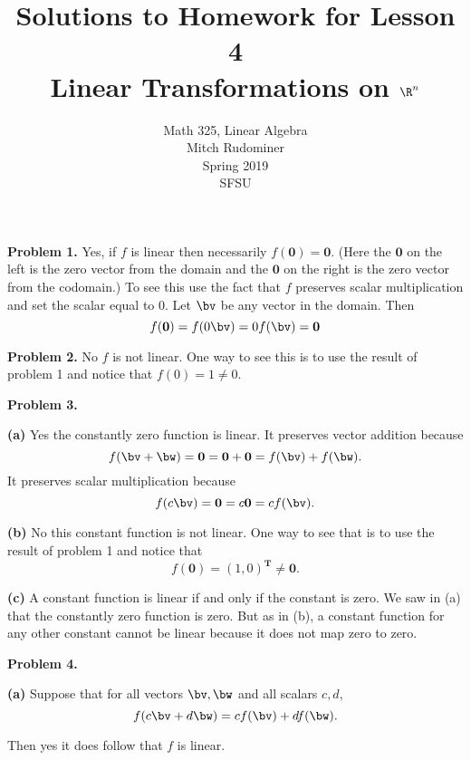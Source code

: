 \documentclass[oneside,12pt]{amsart}
\begin{document}
\title{Solutions to Homework for Lesson 4 \\ Linear Transformations on $\R^n$}
\author{Math 325, Linear Algebra \\ Mitch Rudominer \\ Spring 2019 \\ SFSU }
\date{}

\maketitle


\textbf{Problem 1.} Yes, if $f$ is linear then necessarily
$f(\mathbf{0}) = \mathbf{0}$. (Here the $\mathbf{0}$ on the left is the
zero vector from the domain and the $\mathbf{0}$ on the right is the zero vector
from the codomain.) To see this use the fact that $f$ preserves scalar multiplication
and set the scalar equal to 0. Let $\bv$ be any vector in the domain. Then
$$f(\mathbf{0}) = f(0 \bv) = 0 f(\bv) = \mathbf{0}$$

\smallskip

\textbf{Problem 2.} No $f$ is not linear. One way to see this is to use the
result of problem 1 and notice that $f(0) = 1 \not= 0$.

\smallskip

\textbf{Problem 3.}

\textbf{(a)} Yes the constantly zero function is linear. It preserves vector
addition because
$$f(\bv + \bw) = \mathbf{0} = \mathbf{0} + \mathbf{0} = f(\bv) + f(\bw).$$
It preserves scalar multiplication because
$$f(c \bv) = \mathbf{0} = c \mathbf{0} = c f(\bv).$$

\smallskip

\textbf{(b)} No this constant function is not linear. One way to see that is
to use the result of problem 1 and notice that
$$f(\mathbf{0}) = (1, 0)^{\textbf{T}} \not= \mathbf{0}.$$

\smallskip

\textbf{(c)} A constant function is linear if and only if the constant is zero.
We saw in (a) that the constantly zero function is zero. But as in (b), a constant
function for any other constant cannot be linear because it does not map
zero to zero.

\smallskip

\textbf{Problem 4.}


\textbf{(a)} Suppose that for all vectors $\bv, \bw$ and all scalars $c, d$,
$$f(c\bv + d\bw) = c f(\bv) + d f (\bw).$$

Then yes it does follow that $f$ is linear.
\end{document}
